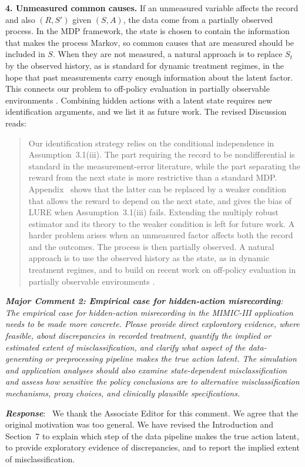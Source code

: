 \documentclass[12pt]{article}
\newcommand{\res}[1]{{\color{red}{#1}}}
\newcommand{\0}{\boldsymbol{0}}
\theoremstyle{definition}
\newcommand{\reviewcomment}[1]{\par\begingroup\itshape\noindent\textbf{#1}:\ }
\newcommand{\reviewresponse}{\par\endgroup\noindent\textbf{\textit{Response}}:\ }
\newenvironment{reproducedtext}{\begin{quote}\small}{\end{quote}}
\begin{document}
\textbf{4. Unmeasured common causes.} If an unmeasured variable affects the record and also $(R,S')$ given $(S,A)$, the data come from a partially observed process. In the MDP framework, the state is chosen to contain the information that makes the process Markov, so common causes that are measured should be included in $S$. When they are not measured, a natural approach is to replace $S_t$ by the observed history, as is standard for dynamic treatment regimes, in the hope that past measurements carry enough information about the latent factor. This connects our problem to off-policy evaluation in partially observable environments \citep{tennenholtz2020off,shi2022minimax,miao2022off,bennett2024proximal}. Combining hidden actions with a latent state requires new identification arguments, and we list it as future work. The revised Discussion reads:
\begin{reproducedtext}
Our identification strategy relies on the conditional independence in Assumption~3.1(iii). The part requiring the record to be nondifferential is standard in the measurement-error literature, while the part separating the reward from the next state is more restrictive than a standard MDP. Appendix~\res{C} shows that the latter can be replaced by a weaker condition that allows the reward to depend on the next state, and gives the bias of LURE when Assumption~3.1(iii) fails. Extending the multiply robust estimator and its theory to the weaker condition is left for future work. A harder problem arises when an unmeasured factor affects both the record and the outcomes. The process is then partially observed. A natural approach is to use the observed history as the state, as in dynamic treatment regimes, and to build on recent work on off-policy evaluation in partially observable environments \citep{tennenholtz2020off,shi2022minimax,miao2022off,bennett2024proximal}.
\end{reproducedtext}

\reviewcomment{Major Comment 2: Empirical case for hidden-action misrecording} The empirical case for hidden-action misrecording in the MIMIC-III application needs to be made more concrete. Please provide direct exploratory evidence, where feasible, about discrepancies in recorded treatment, quantify the implied or estimated extent of misclassification, and clarify what aspect of the data-generating or preprocessing pipeline makes the true action latent. The simulation and application analyses should also examine state-dependent misclassification and assess how sensitive the policy conclusions are to alternative misclassification mechanisms, proxy choices, and clinically plausible specifications.
\reviewresponse
We thank the Associate Editor for this comment. We agree that the original motivation was too general. We have revised the Introduction and Section~7 to explain which step of the data pipeline makes the true action latent, to provide exploratory evidence of discrepancies, and to report the implied extent of misclassification.
\end{document}
